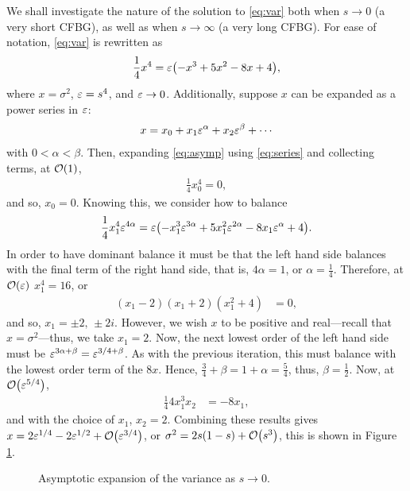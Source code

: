 We shall investigate the nature of the solution to \eqref{eq:var} both when $s \rightarrow 0$ (a very short CFBG), as well as when $s \rightarrow \infty$ (a very long CFBG). For ease of notation, \eqref{eq:var} is rewritten as
\begin{align}
\label{eq:asymp}
\frac{1}{4} x^4 = \eps \left( -x^3 + 5x^2 - 8x + 4 \right),
\end{align}
where $x = \sigma^2$, $\varepsilon = s^4$, and $\varepsilon \rightarrow 0$. Additionally, suppose $x$ can be expanded as a power series in $\varepsilon$:
\begin{align}
\label{eq:series}
x = x_0 + x_1 \varepsilon^\alpha + x_2 \varepsilon^\beta + \cdots
\end{align}
with $0 < \alpha < \beta$. Then, expanding \eqref{eq:asymp} using \eqref{eq:series} and collecting terms, at $\bigO{1}$,
\begin{align*}
\frac{1}{4} x_0^4 = 0,
\end{align*}
and so, $x_0 = 0$. Knowing this, we consider how to balance
\begin{align*}
\frac{1}{4} x_1^4 \eps^{4\alpha} = \eps \left( -x_1^3 \eps^{3\alpha} + 5x_1^2 \eps^{2\alpha} - 8x_1 \eps^\alpha + 4 \right).
\end{align*}
In order to have dominant balance it must be that the left hand side balances with the final term of the right hand side, that is, $4\alpha = 1$, or $\alpha = \frac{1}{4}$. Therefore, at $\bigO{\eps}$ $x_1^4 = 16$, or
\begin{align*}
(x_1 - 2)(x_1 + 2)(x_1^2 + 4) &= 0,
\end{align*}
and so, $x_1 = \pm 2, \, \pm 2 i$. However, we wish $x$ to be positive and real---recall that $x = \sigma^2$---thus, we take $x_1 = 2$. Now, the next lowest order of the left hand side must be $\varepsilon^{3\alpha + \beta} = \varepsilon^{3/4 + \beta}$. As with the previous iteration, this must balance with the lowest order term of the $8x$. Hence, $\frac{3}{4} + \beta = 1 + \alpha = \frac{5}{4}$, thus, $\beta = \frac{1}{2}$. Now, at $\bigO{\eps^{5/4}}$,
\begin{align*}
\frac{1}{4} 4 x_1^3 x_2 &= -8x_1,
\end{align*}
and with the choice of $x_1$, $x_2 = 2$. Combining these results gives $x = 2 \eps^{1/4} - 2 \eps^{1/2} + \bigO{\eps^{3/4}}$, or $\sigma^2 = 2 s \left( 1 - s \right) + \bigO{s^3}$,
this is shown in Figure \ref{fig:lims0}. \\
\begin{figure}[tbp]

\caption{Asymptotic expansion of the variance as $s \rightarrow 0$.}
\label{fig:lims0}
\end{figure}

